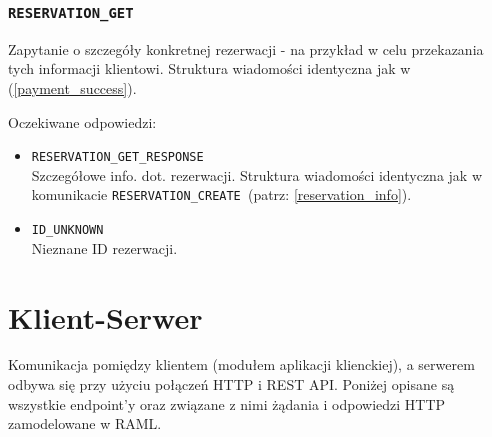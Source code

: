 \documentclass{article}
\begin{document}
\subsubsection{\texttt{RESERVATION\_GET}}
Zapytanie o szczegóły konkretnej rezerwacji - na przykład w celu przekazania tych informacji klientowi. Struktura wiadomości identyczna jak w (\ref{payment_success}).

Oczekiwane odpowiedzi:
\begin{itemize}
    \item \texttt{RESERVATION\_GET\_RESPONSE}\\
    Szczegółowe info. dot. rezerwacji. Struktura wiadomości identyczna jak w komunikacie \texttt{RESERVATION\_CREATE }(patrz: \ref{reservation_info}).
    \item \texttt{ID\_UNKNOWN}\\
    Nieznane ID rezerwacji.
\end{itemize}

\section{Klient-Serwer}
\indent \indent Komunikacja pomiędzy klientem (modułem aplikacji klienckiej), a serwerem odbywa się przy użyciu połączeń HTTP i REST API. Poniżej opisane są wszystkie endpoint'y oraz związane z nimi żądania i odpowiedzi HTTP zamodelowane w RAML.
\end{document}

